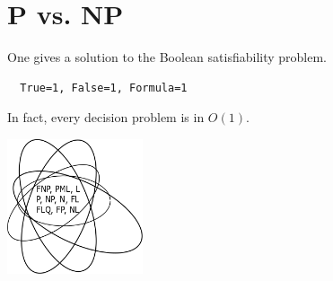 \setcounter{section}{0}

\section{P vs. NP}
One gives a solution to 
the Boolean satisfiability 
problem.
\begin{center}
  \begin{verbatim}
  True=1, False=1, Formula=1
  \end{verbatim}
\end{center}
In fact, every decision problem is in $O(1)$.
\begin{center}
  \includegraphics[width=0.3\textwidth]{venn.png}
\end{center}


